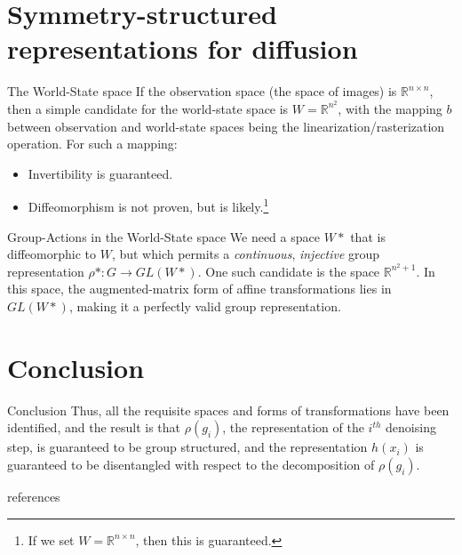 \documentclass{beamer}
\begin{document}
\section{Symmetry-structured representations for diffusion}
\begin{frame}{The World-State space}
  If the observation space (the space of images) is $\mathbb{R}^{n \times n}$, then a simple candidate for the world-state space is $W = \mathbb{R}^{n^2}$, with the mapping $b$ between observation and world-state spaces being the linearization/rasterization operation. For such a mapping:
  \begin{itemize}
  \item Invertibility is guaranteed.
  \item Diffeomorphism is not proven, but is likely.\footnote{If we set $W = \mathbb{R}^{n\times n}$, then this is guaranteed.\cite{lee2003introduction}}
  \end{itemize}
\end{frame}
\begin{frame}{Group-Actions in the World-State space}
  We need a space $W*$ that is diffeomorphic to $W$, but which permits a \textit{continuous}, \textit{injective} group representation $\rho*: G \rightarrow GL(W*)$. One such candidate is the space $\mathbb{R}^{n^2 + 1}$. In this space, the augmented-matrix form of affine transformations lies in $GL(W*)$, making it a perfectly valid group representation.
\end{frame}
\section{Conclusion}
\begin{frame}{Conclusion}
  Thus, all the requisite spaces and forms of transformations have been identified, and the result is that $\rho(g_i)$, the representation of the $i^{th}$ denoising step, is guaranteed to be group structured, and the representation $h(x_i)$ is guaranteed to be disentangled with respect to the decomposition of $\rho(g_i)$.
\end{frame}
\begin{frame}{references}
  
  
\end{frame}
\end{document}
